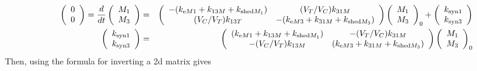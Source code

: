 \begin{eqnarray*}
\left(\begin{array}{c}
0\\
0
\end{array}\right)=\frac{d}{dt}\left(\begin{array}{c}
M_{1}\\
M_{3}
\end{array}\right) & = & \left(\begin{array}{cc}
-(k_{\text{e} M1}+k_{13M}+k_{\text{shed}M_1}) & (V_{T}/V_{C})k_{31M}\\
(V_{C}/V_{T})k_{13T} & -(k_{\text{e} M3}+k_{31M}+k_{\text{shed}M_3})
\end{array}\right)\left(\begin{array}{c}
M_{1}\\
M_{3}
\end{array}\right)_{0}+\left(\begin{array}{c}
k_{\text{syn}1}\\
k_{\text{syn}3}
\end{array}\right)\\
\left(\begin{array}{c}
k_{\text{syn}1}\\
k_{\text{syn}3}
\end{array}\right) & = & \left(\begin{array}{cc}
(k_{\text{e} M1}+k_{13M}+k_{\text{shed}M_1}) & -(V_{T}/V_{C})k_{31M}\\
-(V_{C}/V_{T})k_{13M} & (k_{\text{e} M3}+k_{31M}+k_{\text{shed}M_3})
\end{array}\right)\left(\begin{array}{c}
M_{1}\\
M_{3}
\end{array}\right)_{0}
\end{eqnarray*}
Then, using the formula for inverting a 2d matrix gives

